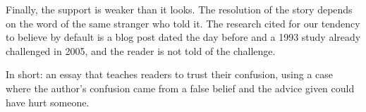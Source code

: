 \begin{afterword}
Finally, the support is weaker than it looks. The resolution of the story depends on the word of the same stranger who told it. The research cited for our tendency to believe by default is a blog post dated the day before and a 1993 study already challenged in 2005, and the reader is not told of the challenge.

In short: an essay that teaches readers to trust their confusion, using a case where the author's confusion came from a false belief and the advice given could have hurt someone.
\end{afterword}
